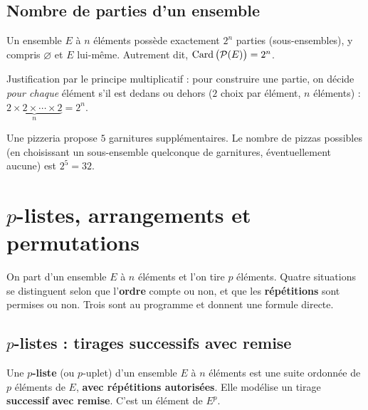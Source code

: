 \subsection{Nombre de parties d'un ensemble}

\begin{theoreme}
Un ensemble $E$ à $n$ éléments possède exactement $2^{n}$ parties (sous-ensembles), y
compris $\varnothing$ et $E$ lui-même. Autrement dit, $\operatorname{Card}\big(\mathcal P(E)\big)=2^{n}$.
\end{theoreme}

\begin{remarque}
Justification par le principe multiplicatif : pour construire une partie, on décide
\emph{pour chaque} élément s'il est \og dedans \fg{} ou \og dehors \fg{} ($2$ choix par
élément, $n$ éléments) : $\underbrace{2\times 2\times\cdots\times 2}_{n}=2^{n}$.
\end{remarque}

\begin{exemple}
Une pizzeria propose $5$ garnitures supplémentaires. Le nombre de pizzas possibles (en
choisissant un sous-ensemble quelconque de garnitures, éventuellement aucune) est
$2^{5}=32$.
\end{exemple}

\section{$p$-listes, arrangements et permutations}

On part d'un ensemble $E$ à $n$ éléments et l'on tire $p$ éléments. Quatre situations se distinguent selon que l'\textbf{ordre} compte ou non, et que les \textbf{répétitions} sont permises ou non. Trois sont au programme et donnent une formule directe.

\subsection{$p$-listes : tirages successifs avec remise}

\begin{definition}[$p$-liste]
Une \textbf{$p$-liste} (ou $p$-uplet) d'un ensemble $E$ à $n$ éléments est une suite ordonnée de $p$ éléments de $E$, \textbf{avec répétitions autorisées}. Elle modélise un tirage \textbf{successif avec remise}. C'est un élément de $E^{p}$.
\end{definition}

